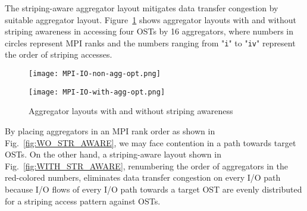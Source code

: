 \documentclass{jhps}
\begin{document}
The striping-aware aggregator layout mitigates data transfer congestion
by suitable aggregator layout.
Figure~\ref{fig:AGG_STR_AWARE} shows aggregator layouts with and
without striping awareness in accessing four OSTs by 16 aggregators,
where numbers in circles represent MPI ranks
and the numbers ranging from "{\tt i}" to "{\tt iv}" represent
the order of striping accesses.
%
\begin{figure}[htb]
\centering
\begin{minipage}[t]{0.42\textwidth}
\centering
\texttt{[image: MPI-IO-non-agg-opt.png]}
\label{fig:WO_STR_AWARE}
\end{minipage}
\noindent
\begin{minipage}[t]{0.42\textwidth}
\centering
\texttt{[image: MPI-IO-with-agg-opt.png]}
\label{fig:WITH_STR_AWARE}
\end{minipage}
\caption{Aggregator layouts with and without striping awareness}
\label{fig:AGG_STR_AWARE}
\end{figure}
%
By placing aggregators in an MPI rank order
as shown in Fig.~\ref{fig:WO_STR_AWARE},
we may face contention in a path towards target OSTs.
On the other hand, a striping-aware layout shown in
Fig.~\ref{fig:WITH_STR_AWARE},
renumbering the order of aggregators in the red-colored numbers,
eliminates data transfer congestion on every I/O path
because I/O flows of every I/O path towards a target OST are
evenly distributed for a striping access pattern against OSTs.
\end{document}
